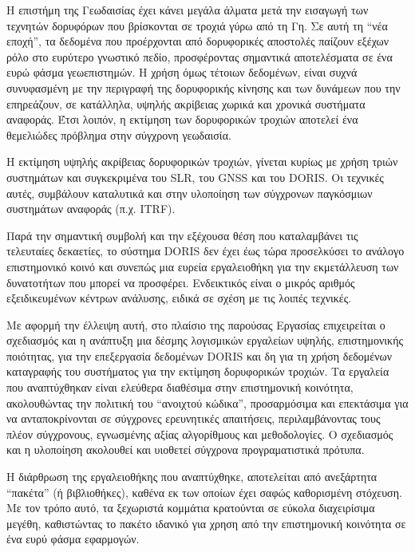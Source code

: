 Η επιστήμη της Γεωδαισίας έχει κάνει μεγάλα άλματα μετά την εισαγωγή των τεχνητών δορυφόρων
που βρίσκονται σε τροχιά γύρω από τη Γη. Σε αυτή τη ``νέα εποχή'', τα δεδομένα που προέρχονται
από δορυφορικές αποστολές παίζουν εξέχων ρόλο στο ευρύτερο γνωστικό πεδίο, προσφέροντας
σημαντικά αποτελέσματα σε ένα ευρώ φάσμα γεωεπιστημών. Η χρήση όμως τέτοιων δεδομένων, είναι συχνά
συνυφασμένη με την περιγραφή της δορυφορικής κίνησης και των δυνάμεων που την επηρεάζουν,
σε κατάλληλα, υψηλής ακρίβειας χωρικά και χρονικά συστήματα αναφοράς. Έτσι λοιπόν, η εκτίμηση
των δορυφορικών τροχιών αποτελεί ένα θεμελιώδες πρόβλημα στην σύγχρονη γεωδαισία.

Η εκτίμηση υψηλής ακρίβειας δορυφορικών τροχιών, γίνεται κυρίως με χρήση τριών συστημάτων
και συγκεκριμένα του \textlatin{SLR}, του \textlatin{GNSS} και του \textlatin{DORIS}. Οι τεχνικές αυτές, συμβάλουν
καταλυτικά και στην υλοποίηση των σύγχρονων παγκόσμιων συστημάτων αναφοράς (π.χ. \textlatin{ITRF}).

Παρά την σημαντική συμβολή και την εξέχουσα θέση που καταλαμβάνει τις τελευταίες δεκαετίες,
το σύστημα \textlatin{DORIS} δεν έχει έως τώρα προσελκύσει το ανάλογο επιστημονικό κοινό και
συνεπώς μια ευρεία εργαλειοθήκη για την εκμετάλλευση των δυνατοτήτων που μπορεί να προσφέρει.
Ενδεικτικός είναι ο μικρός αριθμός εξειδικευμένων κέντρων ανάλυσης, ειδικά σε σχέση με τις
λοιπές τεχνικές.

Με αφορμή την έλλειψη αυτή, στο πλαίσιο της παρούσας Εργασίας επιχειρείται ο σχεδιασμός και
η ανάπτυξη μια δέσμης λογισμικών εργαλείων υψηλής, επιστημονικής ποιότητας, για την επεξεργασία
δεδομένων \textlatin{DORIS} και δη για τη χρήση δεδομένων καταγραφής του συστήματος για την
εκτίμηση δορυφορικών τροχιών. Τα εργαλεία που αναπτύχθηκαν είναι ελεύθερα διαθέσιμα στην επιστημονική
κοινότητα, ακολουθώντας την πολιτική του ``ανοιχτού κώδικα'', προσαρμόσιμα και επεκτάσιμα για να
ανταποκρίνονται σε σύγχρονες ερευνητικές απαιτήσεις, περιλαμβάνοντας τους πλέον σύγχρονους, εγνωσμένης
αξίας αλγορίθμους και μεθοδολογίες. Ο σχεδιασμός και η υλοποίηση ακολουθεί και υιοθετεί σύγχρονα
προγραματιστικά πρότυπα.

Η διάρθρωση της εργαλειοθήκης που αναπτύχθηκε, αποτελείται από ανεξάρτητα ``πακέτα'' (ή βιβλιοθήκες),
καθένα εκ των οποίων έχει σαφώς καθορισμένη στόχευση. Με τον τρόπο αυτό, τα ξεχωριστά κομμάτια
κρατούνται σε εύκολα διαχειρίσιμα μεγέθη, καθιστώντας το πακέτο ιδανικό για χρηση από την
επιστημονική κοινότητα σε ένα ευρύ φάσμα εφαρμογών.

